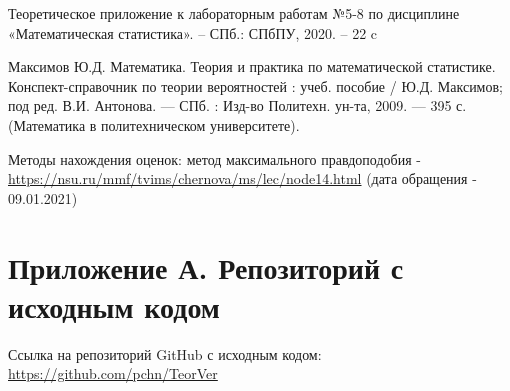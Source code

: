 \documentclass[12pt]{article}
\begin{document}
\newpage
{}
\begin{thebibliography}{9}

    Теоретическое приложение к лабораторным работам №5-8 по дисциплине «Математическая статистика». -- СПб.: СПбПУ, 2020. -- 22 c 
    
    Максимов Ю.Д. Математика. Теория и практика по математической статистике. Конспект-справочник по теории вероятностей : учеб. пособие / Ю.Д. Максимов; под ред. В.И. Антонова. — СПб. : Изд-во Политехн. ун-та, 2009. — 395 с. (Математика в политехническом университете).

    Методы нахождения оценок: метод максимального правдоподобия - \url{https://nsu.ru/mmf/tvims/chernova/ms/lec/node14.html} (дата обращения - 09.01.2021)

\end{thebibliography}
\newpage
\section*{\hypertarget{addition}{Приложение А. Репозиторий с исходным кодом}}
Ссылка на репозиторий GitHub с исходным кодом: \url{https://github.com/pchn/TeorVer}
\end{document}
